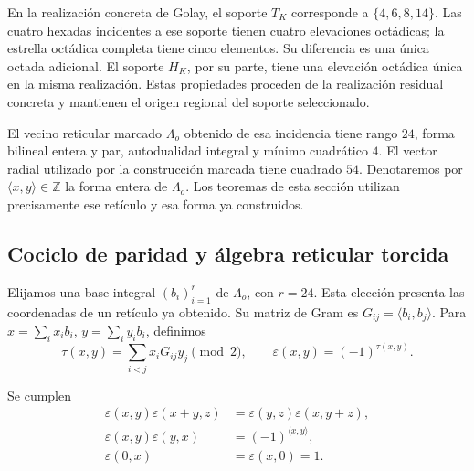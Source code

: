 En la realización concreta de Golay, el soporte \(T_K\) corresponde a
\(\{4,6,8,14\}\). Las cuatro hexadas incidentes a ese soporte tienen
cuatro elevaciones octádicas; la estrella octádica completa tiene cinco
elementos. Su diferencia es una única octada adicional. El soporte
\(H_K\), por su parte, tiene una elevación octádica única en la misma
realización. Estas propiedades proceden de la realización residual
concreta y mantienen el origen regional del soporte seleccionado.

El vecino reticular marcado \(\Lambda_o\) obtenido de esa incidencia
tiene rango \(24\), forma bilineal entera y par, autodualidad integral
y mínimo cuadrático \(4\). El vector radial utilizado por la construcción
marcada tiene cuadrado \(54\). Denotaremos por
\(\langle x,y\rangle\in\mathbb Z\) la forma entera de \(\Lambda_o\).
Los teoremas de esta sección utilizan precisamente ese retículo y esa
forma ya construidos.

\subsection{Cociclo de paridad y álgebra reticular torcida}
\label{subsec:df-cociclo}


Elijamos una base integral \((b_i)_{i=1}^{r}\) de \(\Lambda_o\), con
\(r=24\). Esta elección presenta las coordenadas de un retículo ya
obtenido. Su matriz de Gram es
\(G_{ij}=\langle b_i,b_j\rangle\). Para
\(x=\sum_i x_i b_i\), \(y=\sum_i y_i b_i\), definimos
\begin{equation}
 \tau(x,y)=\sum_{i<j}x_iG_{ij}y_j\pmod2,
 \qquad \varepsilon(x,y)=(-1)^{\tau(x,y)}.
 \label{eq:df-cociclo}
\end{equation}

\begin{proposition}
\label{prop:df-cociclo}
Se cumplen
\begin{align}
 \varepsilon(x,y)\varepsilon(x+y,z)
 &=\varepsilon(y,z)\varepsilon(x,y+z),\label{eq:df-identidad-cociclica}\\
 \varepsilon(x,y)\varepsilon(y,x)
 &=(-1)^{\langle x,y\rangle},\label{eq:df-conmutador-cociclo}\\
 \varepsilon(0,x)&=\varepsilon(x,0)=1.
\end{align}
\end{proposition}


